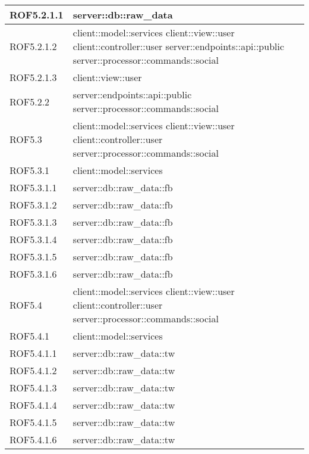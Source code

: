 \begin{center}
\begin{longtable}{| p{4cm} | p{8cm} |}
\hline
ROF5.2.1.1 & server::db::raw\_data \\
\hline
ROF5.2.1.2 & client::model::services \newline client::view::user \newline client::controller::user \newline server::endpoints::api::public \newline server::processor::commands::social \\
\hline
ROF5.2.1.3 & client::view::user \\
\hline
ROF5.2.2 & server::endpoints::api::public \newline server::processor::commands::social \\
\hline
ROF5.3 & client::model::services \newline client::view::user \newline client::controller::user \newline server::processor::commands::social \\
\hline
ROF5.3.1 & client::model::services \\
\hline
ROF5.3.1.1 & server::db::raw\_data::fb \\
\hline
ROF5.3.1.2 & server::db::raw\_data::fb \\
\hline
ROF5.3.1.3 & server::db::raw\_data::fb \\
\hline
ROF5.3.1.4 & server::db::raw\_data::fb \\
\hline
ROF5.3.1.5 & server::db::raw\_data::fb \\
\hline
ROF5.3.1.6 & server::db::raw\_data::fb \\
\hline
ROF5.4 & client::model::services \newline client::view::user \newline client::controller::user \newline server::processor::commands::social \\
\hline
ROF5.4.1 & client::model::services \\
\hline
ROF5.4.1.1 & server::db::raw\_data::tw \\
\hline
ROF5.4.1.2 & server::db::raw\_data::tw \\
\hline
ROF5.4.1.3 & server::db::raw\_data::tw \\
\hline
ROF5.4.1.4 & server::db::raw\_data::tw \\
\hline
ROF5.4.1.5 & server::db::raw\_data::tw \\
\hline
ROF5.4.1.6 & server::db::raw\_data::tw \\
\hline

\end{longtable}
\end{center}
